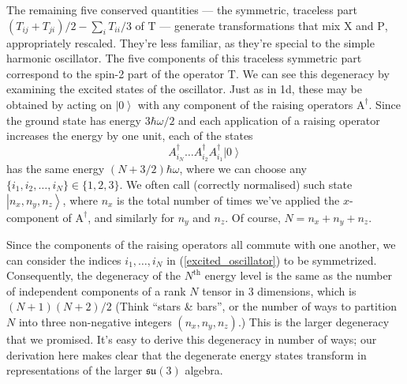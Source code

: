 \documentclass{article}
\theoremstyle{plain}\theoremheaderfont{\normalfont\itshape}\theorembodyfont{\rmfamily}\theoremseparator{.}\newtheorem*{rem}{Remark}\newtheorem*{ex}{Example}\newtheorem*{proof}{Proof}\newtheorem*{altp}{Alternative proof}
\theoremstyle{plain}\theoremheaderfont{\normalfont\bfseries}\theorembodyfont{\rmfamily}\theoremseparator{.}\newtheorem{thm}{Theorem}[section]\newtheorem{lem}[thm]{Lemma}\newtheorem{prop}[thm]{Proposition}\newtheorem*{cor}{Corollary}\newtheorem{defn}[thm]{Definition}\newtheorem{clm}[thm]{Claim}\newtheorem{clminproof}{Claim}
\theoremstyle{break}\theoremheaderfont{\normalfont\itshape}\theorembodyfont{\rmfamily}\theoremseparator{.\medskip}\newtheorem*{proofskip}{Proof}\newtheorem*{exs}{Examples}\newtheorem*{rems}{Remarks}
\theoremstyle{break}\theoremheaderfont{\normalfont\bfseries}\theorembodyfont{\rmfamily}\theoremseparator{.\medskip}\newtheorem{lemskip}[thm]{Lemma}\newtheorem{defnskip}[thm]{Definition}\newtheorem{propskip}[thm]{Proposition}\newtheorem{thmskip}[thm]{Theorem}
\numberwithin{equation}{section}
\newcommand{\ket}[1]{\left| #1 \right\rangle}
\newcommand{\vb}[1]{\bm{\mathrm{#1}}}
\begin{document}
    The remaining five conserved quantities --- the symmetric, traceless part \((T_{ij}+T_{ji})/2-\sum_i T_{ii}/3\) of \(\vb{T}\) --- generate transformations that mix \(\vb{X}\) and \(\vb{P}\), appropriately rescaled. They're less familiar, as they're special to the simple harmonic oscillator. The five components of this traceless symmetric part correspond to the spin-2 part of the operator \(\vb{T}\). We can see this degeneracy by examining the excited states of the oscillator. Just as in 1d, these may be obtained by acting on \(\ket{\vb{0}}\) with any component of the raising operators \(\vb{A}^\dagger\). Since the ground state has energy \(3\hbar\omega/2\) and each application of a raising operator increases the energy by one unit, each of the states
    \begin{equation}\label{excited_oscillator}
        A_{i_N}^\dagger\dots A_{i_2}^\dagger A_{i_1}^\dagger\ket{\vb{0}}
    \end{equation}
    has the same energy \((N+3/2)\hbar\omega\), where we can choose any \(\{i_1,i_2,\dots, i_N\}\in\{1,2,3\}\). We often call (correctly normalised) such state \(\ket{n_x,n_y,n_z}\), where \(n_x\) is the total number of times we've applied the \(x\)-component of \(\vb{A}^\dagger\), and similarly for \(n_y\) and \(n_z\). Of course, \(N=n_x+n_y+n_z\).

    Since the components of the raising operators all commute with one another, we can consider the indices \(i_1,\dots,i_N\) in (\ref{excited_oscillator}) to be symmetrized. Consequently, the degeneracy of the \(N^{\text{th}}\) energy level is the same as the number of independent components of a rank \(N\) tensor in 3 dimensions, which is \((N+1)(N+2)/2\) (Think ``stars \& bars'', or the number of ways to partition \(N\) into three non-negative integers \((n_x,n_y,n_z)\).) This is the larger degeneracy that we promised. It's easy to derive this degeneracy in number of ways; our derivation here makes clear that the degenerate energy states transform in representations of the larger \(\mathfrak{su}(3)\) algebra.
\end{document}
